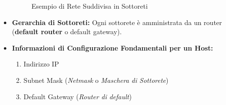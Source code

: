 \begin{itemize}
\begin{figure}[H]
        \caption{Esempio di Rete Suddivisa in Sottoreti}
    \end{figure}
    
    \item \textbf{Gerarchia di Sottoreti:} Ogni sottorete è amministrata da un router (\textbf{default router} o default gateway).
    \item \textbf{Informazioni di Configurazione Fondamentali per un Host:}
    \begin{enumerate}
        \item Indirizzo IP
        \item Subnet Mask (\textit{Netmask} o \textit{Maschera di Sottorete})
        \item Default Gateway (\textit{Router di default})
    \end{enumerate}
\end{itemize}

